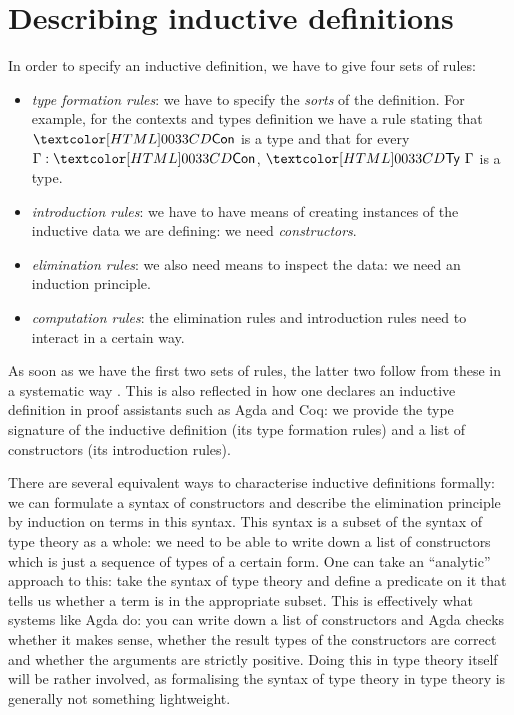 \chapter{Describing inductive definitions}
\label{describing}

In order to specify an inductive definition, we have to give four sets
of rules:
\begin{itemize}
\item \emph{type formation rules}: we have to specify the \emph{sorts}
  of the definition. For example, for the contexts and types
  definition we have a rule stating that $\ttconty$ is a type and that
  for every $\Gamma : \ttconty$, $\tttyty\ \Gamma$ is a type.
\item \emph{introduction rules}: we have to have means of creating
  instances of the inductive data we are defining: we need
  \emph{constructors}.
\item \emph{elimination rules}: we also need means to inspect the
  data: we need an induction principle.
\item \emph{computation rules}: the elimination rules and introduction
  rules need to interact in a certain way.
\end{itemize}

As soon as we have the first two sets of rules, the latter two follow
from these in a systematic way \cite{Backhouse1989}. This is also
reflected in how one declares an inductive definition in proof
assistants such as Agda and Coq: we provide the type signature of the
inductive definition (its type formation rules) and a list of
constructors (its introduction rules).

There are several equivalent ways to characterise inductive
definitions formally: we can formulate a syntax of constructors and
describe the elimination principle by induction on terms in this
syntax. This syntax is a subset of the syntax of type theory as a
whole: we need to be able to write down a list of constructors which
is just a sequence of types of a certain form. One can take an
``analytic'' approach to this: take the syntax of type theory and
define a predicate on it that tells us whether a term is in the
appropriate subset. This is effectively what systems like Agda do: you
can write down a list of constructors and Agda checks whether it makes
sense, \eg whether the result types of the constructors are correct
and whether the arguments are strictly positive. Doing this in type
theory itself will be rather involved, as formalising the syntax of
type theory in type theory is generally not something lightweight.

